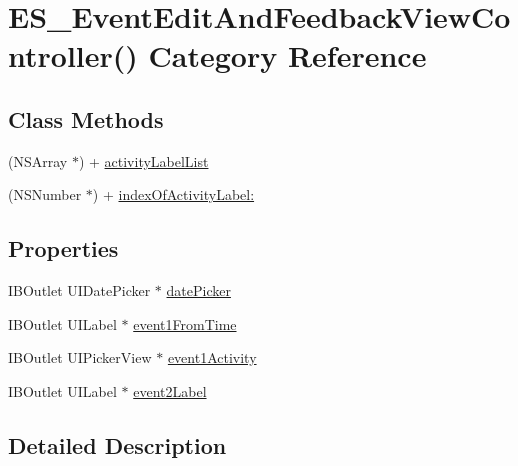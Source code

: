 \hypertarget{category_e_s___event_edit_and_feedback_view_controller_07_08}{\section{E\+S\+\_\+\+Event\+Edit\+And\+Feedback\+View\+Controller() Category Reference}
\label{category_e_s___event_edit_and_feedback_view_controller_07_08}
}
\subsection*{Class Methods}
\begin{DoxyCompactItemize}
\item 
(N\+S\+Array $\ast$) + \hyperlink{category_e_s___event_edit_and_feedback_view_controller_07_08_a05cf44c60276ee98043636a56c67ae74}{activity\+Label\+List}
\item 
(N\+S\+Number $\ast$) + \hyperlink{category_e_s___event_edit_and_feedback_view_controller_07_08_a3fb43477b8faf49525ae6c3bebbea2fd}{index\+Of\+Activity\+Label\+:}
\end{DoxyCompactItemize}
\subsection*{Properties}
\begin{DoxyCompactItemize}
\item 
I\+B\+Outlet U\+I\+Date\+Picker $\ast$ \hyperlink{category_e_s___event_edit_and_feedback_view_controller_07_08_a7ca843439ff111957ef6803b44746743}{date\+Picker}
\item 
I\+B\+Outlet U\+I\+Label $\ast$ \hyperlink{category_e_s___event_edit_and_feedback_view_controller_07_08_a99e9a66ccd6387758f50c9721622d41d}{event1\+From\+Time}
\item 
I\+B\+Outlet U\+I\+Picker\+View $\ast$ \hyperlink{category_e_s___event_edit_and_feedback_view_controller_07_08_a0715a782decc6380aa28960d643b16d5}{event1\+Activity}
\item 
I\+B\+Outlet U\+I\+Label $\ast$ \hyperlink{category_e_s___event_edit_and_feedback_view_controller_07_08_ab1561af5dcc45be515718d87bc57af2d}{event2\+Label}
\end{DoxyCompactItemize}


\subsection{Detailed Description}


